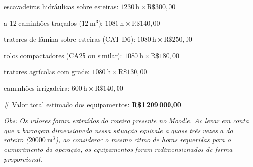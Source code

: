 \documentclass[a4paper, 12pt, brazilian]{article}
\begin{document}
	 escavadeiras hidráulicas sobre esteiras: $\SI{1230}{\hour}\times\textrm{R\$}300,00$
	
	 a 12 caminhões traçados ($\SI{12}{\meter^{3}}$): $\SI{1080}{\hour}\times\textrm{R\$}140,00$
	
	 tratores de lâmina sobre esteiras (CAT D6): $\SI{1080}{\hour}\times\textrm{R\$}250,00$
	
	 rolos compactadores (CA25 ou similar):  $\SI{1080}{\hour}\times\textrm{R\$}180,00$
	
	 tratores agrícolas com grade: $\SI{1080}{\hour}\times\textrm{R\$}130,00$
	
	 caminhões irrigadeira:  $\SI{600}{\hour}\times\textrm{R\$}140,00$
	
	\# Valor total estimado dos equipamentos: \textbf{R\$1\,209\,000,00}
	\vspace{1cm}

	\textit{Obs: Os valores foram extraídos do roteiro presente no Moodle. Ao levar em conta que a barragem dimensionada nessa situação equivale a quase três vezes a do roteiro \textrm{($\SI{20000}{\meter^{3}}$)}, ao considerar o mesmo ritmo de horas requeridas para o cumprimento da operação, os equipamentos foram redimensionados de forma proporcional.}
	
\end{document}
